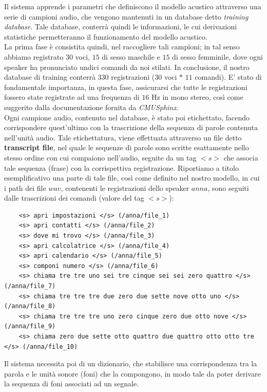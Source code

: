 \documentclass[12pt]{article}
\begin{document}
    Il sistema apprende i parametri che definiscono il modello acustico attraverso una serie di campioni audio, che vengono mantenuti in un database detto \textit{training database}. Tale database, conterrà quindi le informazioni, le cui derivazioni statistiche permetteranno il funzionamento del modello acustico.\\
    La prima fase è consistita quindi, nel raccogliere tali campioni; in tal senso abbiamo registrato $30$ voci, $15$ di sesso maschile e $15$ di sesso femminile, dove ogni speaker ha pronunciato undici comandi da noi stilati. In conclusione, il nostro database di training conterrà $330$ registrazioni ($30$ voci $*$ $11$ comandi). E' stato di  fondamentale importanza, in questa fase, assicurarsi che tutte le registrazioni fossero state registrate ad una frequenza di $16$ Hz in mono stereo, così come suggerito dalla documentazione fornita da \textit{CMUSphinx}.\\       
    Ogni campione audio, contenuto nel database, è stato poi etichettato, facendo corrispondere quest'ultimo con la trascrizione della sequenza di parole contenuta nell'unità audio.
    Tale etichettatura, viene effettuata attraverso un file detto \textbf{transcript file}, nel quale le sequenze di parole sono scritte esattamente nello stesso ordine con cui compaiono nell'audio, seguite da un tag $<s>$ che associa tale sequenza (frase) con la corrispettiva registrazione.
    Riportiamo a titolo esemplificativo una parte di tale file, così come definito nel nostro modello, in cui i path dei file $wav$, contenenti le registrazioni dello speaker $anna$, sono seguiti dalle trascrizioni dei comandi (valore del tag $<s>$):
    \newpage
    \begin{lstlisting}
    <s> apri impostazioni </s> (/anna/file_1)
    <s> apri contatti </s> (/anna/file_2)
    <s> dove mi trovo </s> (/anna/file_3)
    <s> apri calcolatrice </s> (/anna/file_4)
    <s> apri calendario </s> (/anna/file_5)
    <s> componi numero </s> (/anna/file_6)
    <s> chiama tre tre uno sei tre cinque sei sei zero quattro </s> (/anna/file_7)
    <s> chiama tre tre tre due zero due sette nove otto uno </s> (/anna/file_8)
    <s> chiama tre tre tre uno zero cinque zero due otto nove </s> (/anna/file_9)
    <s> chiama zero due sette otto quattro due quattro otto otto tre </s> (/anna/file_10)    
    \end{lstlisting}
    
    Il sistema necessita poi di un dizionario, che stabilisce una corrispondenza tra la parola e le unità sonore (foni) che la compongono, in modo tale da poter derivare la sequenza di foni associati ad un segnale.
    
\end{document}
